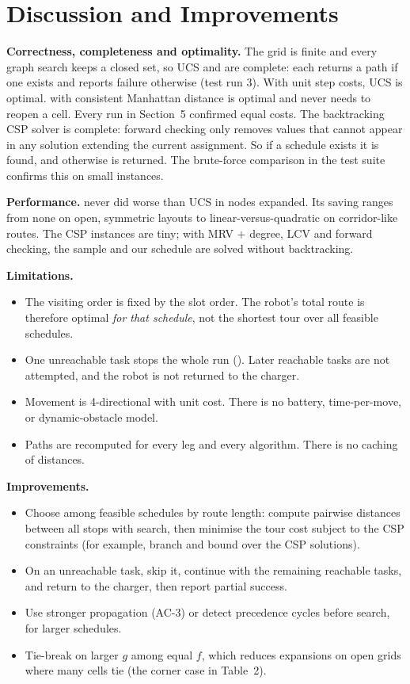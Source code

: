 \section{Discussion and Improvements}

\textbf{Correctness, completeness and optimality.} The grid is finite and every graph search keeps a
closed set, so UCS and \astar{} are complete: each returns a path if one exists and reports failure
otherwise (test run 3). With unit step costs, UCS is optimal. \astar{} with consistent Manhattan
distance is optimal and never needs to reopen a cell. Every run in Section~5 confirmed equal costs.
The backtracking CSP solver is complete: forward checking only removes values that cannot appear in
any solution extending the current assignment. So if a schedule exists it is found, and otherwise
 is returned. The brute-force comparison in the test suite confirms this on small
instances.

\textbf{Performance.} \astar{} never did worse than UCS in nodes expanded. Its saving ranges from
none on open, symmetric layouts to linear-versus-quadratic on corridor-like routes. The CSP
instances are tiny; with MRV $+$ degree, LCV and forward checking, the sample and our schedule are
solved without backtracking.

\textbf{Limitations.}
\begin{itemize}
  \item The visiting order is fixed by the slot order. The robot's total route is therefore optimal
    \emph{for that schedule}, not the shortest tour over all feasible schedules.
  \item One unreachable task stops the whole run (). Later reachable tasks are not
    attempted, and the robot is not returned to the charger.
  \item Movement is 4-directional with unit cost. There is no battery, time-per-move, or
    dynamic-obstacle model.
  \item Paths are recomputed for every leg and every algorithm. There is no caching of distances.
\end{itemize}

\textbf{Improvements.}
\begin{itemize}
  \item Choose among feasible schedules by route length: compute pairwise distances between all
    stops with search, then minimise the tour cost subject to the CSP constraints (for example,
    branch and bound over the CSP solutions).
  \item On an unreachable task, skip it, continue with the remaining reachable tasks, and return to
    the charger, then report partial success.
  \item Use stronger propagation (AC-3) or detect precedence cycles before search, for larger
    schedules.
  \item Tie-break \astar{} on larger $g$ among equal $f$, which reduces expansions on open grids
    where many cells tie (the corner case in Table~2).
\end{itemize}
